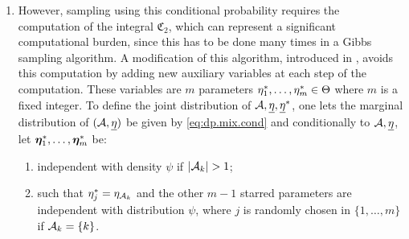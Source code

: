 \begin{enumerate}[label=(\arabic*), wide=0.5cm]
We can write $\Phi(\CA, \useta|\usx)$ in the form
\begin{equation}
\label{eq:dp.gs.1}
\Phi(\CA, \useta|\usx) \propto q(\CA_k, \eta_{\CA_k}) \phi(x_k|\eta_{\CA_k})\frac{\la^{|\CA^{(k)}|-1} \prod_{B \in A^{(k)}} (|B|-1)!}{(\la+1) \cdots (\la+N-1)} \prod_{B \in \CA^{(k)}} \psi(\eta_B) \prod_{l \in B}  \phi(x_l|\eta_B)
\end{equation}
with
\[
q(A, \th) = \sum_{B\in \CA^{(k)}} |B| \bfone_{A = B\cup \{k\}} + \la \psi(\th) \bfone_{A = \{k\}}
\]
Partitions $\CA'$ that are consistent with $\CA^{(k)}$ allocate $k$ to one of the clusters in $\CA^{(k)}$ or create a new cluster with a new parameter $\eta'_k$. If one replaces $(\CA, \bfeta)$ by $(\CA', \bfeta')$, only the first two terms in \cref{eq:dp.gs.1} will be affected, so that the conditional probability of $\CA'$ given $\CA^{(k)}$ is proportional to $q(\CA'_k, \eta_{\CA'_k})\phi(x_k|\eta_{\CA'_k})$ and  given by
\[
\left\{ 
\begin{aligned}
&\frac{|B| \phi(x_k|\eta_B)}{\mathfrak C_1 + \la\mathfrak C_2} \text{ if } \CA'_k = B\cup \{k\}, \eta'_B = \eta_B, B\in \CA^{(k)}\\
& \frac{\la \phi(x_k|\eta'_k) \psi(\eta'_k)}{\mathfrak C_1 + \la\mathfrak C_2} \text{ if } \CA'_k = \{k\}, 
\end{aligned}
\right.
\]
where 
\[
\mathfrak C_1 = \sum_{B \in \CA^{k}} |B| \phi(x_k|\eta_B) \quad \text{ and }\quad  \mathfrak C_2 = \int_{\Th} \phi(x_k|\th) \psi(\th) d\th.
\]
Concretely, this means that one first decides to allocate $k$ to a set $B$ in $\CA^{(k)}$ with probability $|B| \phi(x_k|\eta_B)/(\mathfrak C_1 + \lambda\mathfrak C_2)$ and to create a new set with probability $\la \mathfrak C_2 / (\mathfrak C_1 + \la\mathfrak C_2)$. If a new set is created, then the associated parameter $\eta'_{\{k\}}$ is sampled according to the p.d.f. $\phi(x_k|\th) \psi(\th/\mathfrak C_2$.

\item However, sampling using this conditional probability  requires the computation of the integral $\mathfrak C_2$, which can represent a significant computational burden, since this has to be done many times in a Gibbs sampling algorithm.
A modification of this algorithm, introduced in \citet{neal2000markov}, avoids this computation by adding new auxiliary variables at each step of the computation. These  variables are $m$ parameters $\eta_1^*, \ldots, \eta_m^*\in \Theta$ where $m$ is a fixed integer. To define the joint distribution of ${\mathcal A}, {\underline{\eta}}, {\underline{\eta}}^*$, one lets the marginal distribution of $({\mathcal A}, {\underline{\eta}})$ be given by \cref{eq:dp.mix.cond} and conditionally to ${\mathcal A}, {\underline{\eta}}$, let ${\bm{\eta}}^*_1, \ldots, {\bm{\eta}}^*_m$ be:
\begin{enumerate}[label = $(\roman*)$, wide=0.5cm]
\item independent with density $\psi$ if $|{\mathcal A}_k| > 1$;
\item such that $\eta^*_j = \eta_{{\mathcal A}_k}$ and the other $m-1$ starred parameters are independent with distribution $\psi$, where $j$ is randomly chosen in $\{1, \ldots, m\}$ if ${\mathcal A}_k = \{k\}$.
\end{enumerate} 


\end{enumerate}
